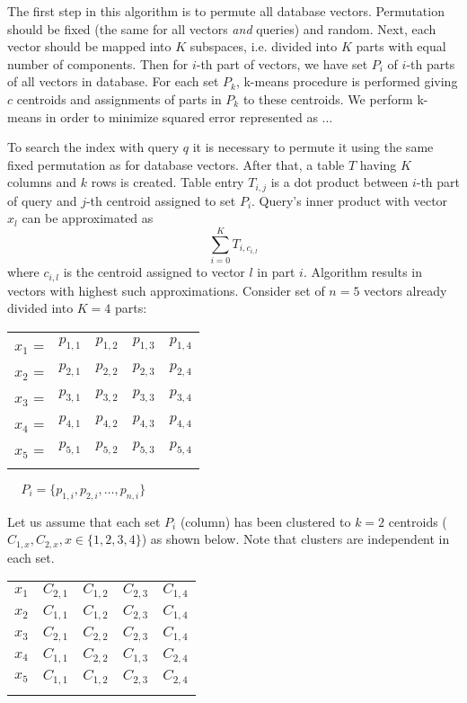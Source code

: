 The first step in this algorithm is to permute all database vectors.
Permutation should be fixed (the same for all vectors \textit{and} queries) and random.
Next, each vector should be mapped into $K$ subspaces, i.e. divided into $K$ parts with equal number of components.
Then for $i$-th part of vectors, we have set $P_i$ of $i$-th parts of all vectors in database.
For each set $P_k$, k-means procedure is performed giving $c$ centroids and assignments of parts in $P_k$ to these centroids.
We perform k-means in order to minimize squared error represented as ...
\par
To search the index with query $q$ it is necessary to permute it using the same fixed permutation as for database vectors.
After that, a table $T$ having $K$ columns and $k$ rows is created.
Table entry $T_{i,j}$ is a dot product between $i$-th part of query and $j$-th centroid assigned to set $P_i$.
Query's inner product with vector $x_l$ can be approximated as $$\sum_{i=0}^{K} T_{i,c_{i,l}}$$
where $c_{i,l}$ is the centroid assigned to vector $l$ in part $i$. Algorithm results in vectors with highest such approximations.
Consider set of $n = 5$ vectors already divided into $K = 4$ parts:

\smallskip

\begin{center}
\begin{tabular}{c|c|c|c|c|}
\hhline{~----}
$x_1$ = & $p_{1,1}$ & $p_{1,2}$ & $p_{1,3}$ & $p_{1,4}$ \\
\hhline{~----}
$x_2$ = & $p_{2,1}$ & $p_{2,2}$ & $p_{2,3}$ & $p_{2,4}$ \\
\hhline{~----}
$x_3$ = & $p_{3,1}$ & $p_{3,2}$ & $p_{3,3}$ & $p_{3,4}$ \\
\hhline{~----}
$x_4$ = & $p_{4,1}$ & $p_{4,2}$ & $p_{4,3}$ & $p_{4,4}$ \\
\hhline{~----}
$x_5$ = & $p_{5,1}$ & $p_{5,2}$ & $p_{5,3}$ & $p_{5,4}$ \\
\hhline{~----}
\end{tabular}
$\ \ \ \ \ P_i = \{ p_{1,i}, p_{2,i}, \ldots, p_{n,i} \}$ \\
\end{center}

\smallskip

Let us assume that each set $P_i$ (column) has been clustered to $k=2$ centroids ($C_{1,x}, C_{2,x}, x \in \{1,2,3,4\}$) as shown below. Note that clusters are independent in each set.
\smallskip
\begin{center}
\begin{tabular}{c|c|c|c|c|}
\hhline{~----}
$x_1$ & $C_{2,1}$ & $C_{1,2}$ & $C_{2,3}$ & $C_{1,4}$ \\
\hhline{~----}
$x_2$ & $C_{1,1}$ & $C_{1,2}$ & $C_{2,3}$ & $C_{1,4}$ \\
\hhline{~----}
$x_3$ & $C_{2,1}$ & $C_{2,2}$ & $C_{2,3}$ & $C_{1,4}$ \\
\hhline{~----}
$x_4$ & $C_{1,1}$ & $C_{2,2}$ & $C_{1,3}$ & $C_{2,4}$ \\
\hhline{~----}
$x_5$ & $C_{1,1}$ & $C_{1,2}$ & $C_{2,3}$ & $C_{2,4}$ \\
\hhline{~----}
\end{tabular}
\end{center}


